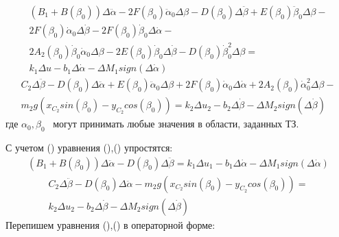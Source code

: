 {\begin{equation}
\label{eq:p3:55}
\begin{multlined}
\left( B_{1}+B \left( \beta _{0} \right) \right) \Delta \ddot \alpha -
2F \left( \beta _{0} \right)\ddot \alpha _{0} \Delta \beta -
D \left( \beta _{0} \right) \Delta \ddot \beta +
E \left( \beta _{0} \right) \ddot \beta _{0} \Delta \beta -\\
2F \left( \beta _{0} \right) \dot \alpha _{0} \Delta \dot \beta -
2F \left( \beta _{0} \right) \dot \beta _{0} \Delta \dot \alpha -\\
2A_{2} \left( \beta _{0} \right) \dot \beta _{0} \dot \alpha _{0} \Delta \beta -
2E \left( \beta _{0} \right) \dot \beta _{0} \Delta \dot \beta -
D \left( \beta _{0} \right) \dot \beta _{0}^{2} \Delta \beta =\\
k_{1} \Delta u-
b_{1} \Delta \dot \alpha - \Delta M_{1}sign \left( \Delta \dot \alpha \right)
\end{multlined}
\end{equation}
\begin{equation}
\label{eq:p3:56}
\begin{multlined}
C_{2} \Delta \ddot \beta -
D \left( \beta _{0} \right) \Delta \ddot \alpha +
E \left( \beta _{0} \right) \ddot \alpha _{0} \Delta \beta +
2F \left( \beta _{0} \right) \dot \alpha _{0} \Delta \dot \alpha +
2A_{2} \left( \beta _{0} \right) \dot \alpha _{0}^{2} \Delta \beta -\\
m_{2}g \left( 
x_{C_{2}}sin \left( \beta _{0} \right) -
y_{C_{2}}cos \left( \beta _{0} \right) 
\right) =
k_{2} \Delta u_{2}-
b_{2} \Delta \dot \beta - 
\Delta M_{2}sign \left( \Delta \dot \beta \right) 
\end{multlined}
\end{equation}
где \( \alpha _{0}, \beta _{0} \) \ могут принимать любые значения в области, заданных ТЗ. 

С учетом () уравнения (),() упростятся: 
\begin{equation}
\label{eq:p3:57}
\begin{multlined}
\left( B_{1}+B \left( \beta _{0} \right) \right) \Delta \ddot \alpha -
D \left( \beta _{0} \right) \Delta \ddot \beta 
=
k_{1} \Delta u_{1} -
b_{1} \Delta \dot \alpha - 
\Delta M_{1}sign \left( \Delta \dot \alpha \right) 
\end{multlined}
\end{equation}
\begin{equation}
\label{eq:p3:58}
\begin{multlined}
C_{2} \Delta \ddot \beta -
D \left( \beta _{0} \right) \Delta \ddot \alpha -
m_{2}g \left( x_{C_{2}}sin \left( \beta _{0} \right) -
y_{C_{2}}cos \left( \beta _{0} \right) \right) 
=\\
k_{2} \Delta u_{2}-
b_{2} \Delta \dot \beta - 
\Delta M_{2}sign \left( \Delta \dot \beta \right) 
\end{multlined}
\end{equation}
Перепишем уравнения (),() в операторной форме: 


}
